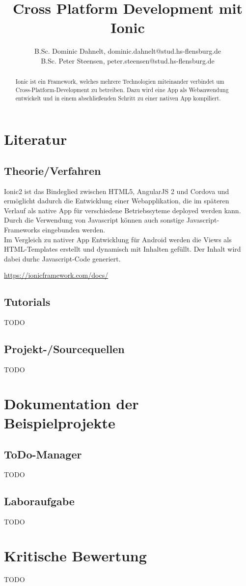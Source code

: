 \documentclass[german]{lni}
\author{B.Sc. Dominic Dahnelt, dominic.dahnelt@stud.hs-flensburg.de\\
B.Sc. Peter Steensen, peter.steensen@stud.hs-flensburg.de}
\title{Cross Platform Development mit Ionic}
\begin{document}
\maketitle

\begin{abstract}
	Ionic ist ein Framework, welches mehrere Technologien miteinander verbindet um Cross-Platform-Development zu betreiben. Dazu wird eine App als Webanwendung entwickelt und in einem abschließenden Schritt zu einer nativen App kompiliert.
\end{abstract}

\section{Literatur}
\subsection{Theorie/Verfahren}
Ionic2 ist das Bindeglied zwischen HTML5, AngularJS 2 und Cordova und ermöglicht dadurch die Entwicklung einer Webapplikation, die im späteren Verlauf als native App für verschiedene Betriebssyteme deployed werden kann. Durch die Verwendung von Javascript können auch sonstige Javascript-Frameworks eingebunden werden.
\\
Im Vergleich zu nativer App Entwicklung für Android  werden die Views als HTML-Templates erstellt und dynamisch mit Inhalten gefüllt. Der Inhalt wird dabei durhc Javascript-Code generiert.
\par 
\url{https://ionicframework.com/docs/}

\subsection{Tutorials}
TODO
\subsection{Projekt-/Sourcequellen}
TODO

\section{Dokumentation der Beispielprojekte}
\subsection{ToDo-Manager}
TODO
\subsection{Laboraufgabe}
TODO
\section{Kritische Bewertung}
TODO

%
\end{document}
